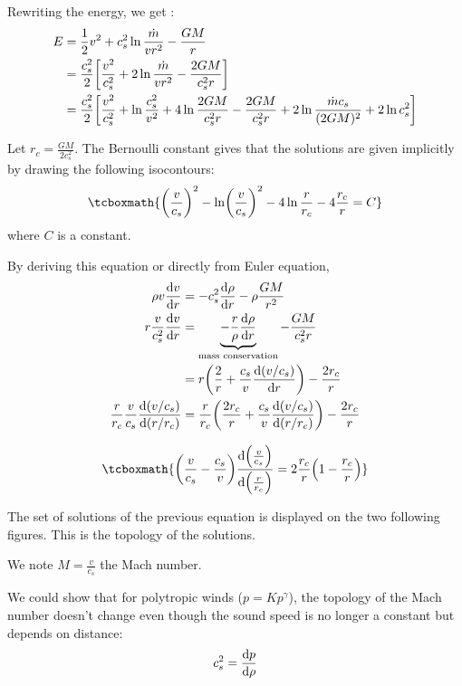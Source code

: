 \documentclass[10pt,a4paper,english]{article}
\let\originalleft\left
\let\originalright\right
\renewcommand{\left}{\mathopen{}\mathclose\bgroup\originalleft}
\renewcommand{\right}{\aftergroup\egroup\originalright}
\begin{document}
Rewriting the energy, we get :
\begin{align}
    E &= \frac{1}{2}v^2 + c_s^2 \ln \frac{\dot{m}}{vr^2} - \frac{GM}{r} \\
      &= \frac{c_s^2}{2}\left[ \frac{v^2}{c_s^2} + 2\ln \frac{\dot{m}}{vr^2} - \frac{2GM}{c_s^2r}\right] \\
      &= \frac{c_s^2}{2} \left[\frac{v^2}{c_s^2} + \ln \frac{c_s^2}{v^2} + 4\ln \frac{2GM}{c_s^2r} - \frac{2GM}{c_s^2r} + 2\ln \frac{\dot{m}c_s}{(2GM)^2} + 2\ln c_s^2\right]
\end{align}

Let $r_c = \frac{GM}{2c_s^2}$. The Bernoulli constant gives that the
solutions are given implicitly by drawing the following isocontours:
\begin{equation}
    \tcboxmath{
        \left( \frac{v}{c_s} \right)^2 - \ln \left( \frac{v}{c_s} \right)^2 - 4\ln \frac{r}{r_c} - 4 \frac{r_c }{r} = C
    }
\end{equation}
where $C$ is a constant.

By deriving this equation or directly from Euler equation,
\begin{align}
    \rho v \frac{\d v}{\d r}  &= -c_s^2 \frac{\d \rho}{\d r} - \rho \frac{GM}{r^2} \\
    r \frac{v}{c_s^2} \frac{\d v}{\d r} &= \underbrace{-\frac{r}{\rho}\frac{\d \rho}{\d r}}_\textrm{mass conservation} - \frac{GM}{c_s^2r} \\
                            &= r \left( \frac{2}{r} + \frac{c_s}{v} \frac{\d(v/c_s)}{\d r} \right) - \frac{2r_c }{r} \\
    \frac{r}{r_c }\frac{v}{c_s }\frac{\d (v/c_s)}{\d (r/r_c)} & = \frac{r}{r_c} \left( \frac{2r_c }{r} + \frac{c_s}{v} \frac{\d(v/c_s)}{\d(r/r_c )} \right) - \frac{2r_c }{r}
\end{align}

\begin{equation}
    \label{eq:speed_eq}
    \tcboxmath{
        \left( \frac{v}{c_s} - \frac{c_s}{v} \right) \frac{\d \left( \frac{v}{c_s} \right) }{\d \left( \frac{r}{r_c } \right) } = 2 \frac{r_c}{r} \left( 1 - \frac{r_c }{r} \right)
    }
\end{equation}

The set of solutions of the previous equation is displayed on the two following
figures. This is the topology of the solutions.

We note $M = \frac{v}{c_s}$ the Mach number.

We could show that for polytropic winds ($p = Kp^\gamma$), the topology of the
Mach number doesn't change even though the sound speed is no longer a constant
but depends on distance:
\begin{equation}
    c_s^2 = \frac{\mathrm{d} p}{\mathrm{d} \rho}
\end{equation}
\end{document}

